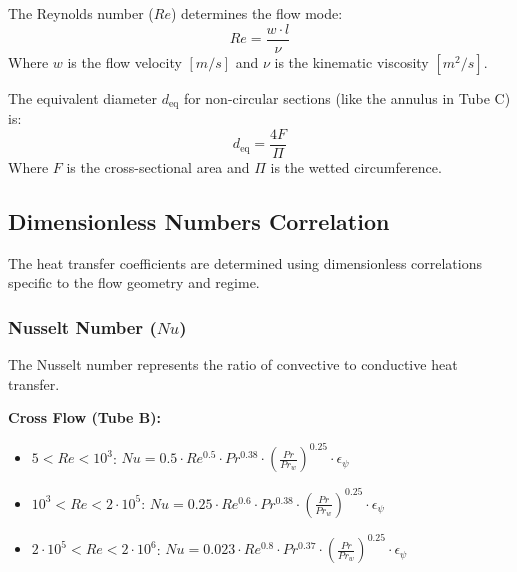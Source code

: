 The Reynolds number ($Re$) determines the flow mode:
\begin{equation}
    Re = \frac{w \cdot l}{\nu}
\end{equation}
Where $w$ is the flow velocity $[m/s]$ and $\nu$ is the kinematic viscosity $[m^2/s]$.

The equivalent diameter $d_{\text{eq}}$ for non-circular sections (like the annulus in Tube C) is:
\begin{equation}
    d_{\text{eq}} = \frac{4F}{\Pi}
\end{equation}
Where $F$ is the cross-sectional area and $\Pi$ is the wetted circumference.

\subsection{Dimensionless Numbers Correlation}\label{correlations}

The heat transfer coefficients are determined using dimensionless correlations specific to the flow geometry and regime.

\subsubsection{Nusselt Number ($Nu$)}\label{nu-number}

The Nusselt number represents the ratio of convective to conductive heat transfer.

\textbf{Cross Flow (Tube B):}
\begin{itemize}
    \item $5 < Re < 10^3$: $Nu = 0.5 \cdot Re^{0.5} \cdot Pr^{0.38} \cdot \left(\frac{Pr}{Pr_w}\right)^{0.25} \cdot \epsilon_\psi$
    \item $10^3 < Re < 2 \cdot 10^5$: $Nu = 0.25 \cdot Re^{0.6} \cdot Pr^{0.38} \cdot \left(\frac{Pr}{Pr_w}\right)^{0.25} \cdot \epsilon_\psi$
    \item $2 \cdot 10^5 < Re < 2 \cdot 10^6$: $Nu = 0.023 \cdot Re^{0.8} \cdot Pr^{0.37} \cdot \left(\frac{Pr}{Pr_w}\right)^{0.25} \cdot \epsilon_\psi$
\end{itemize}

